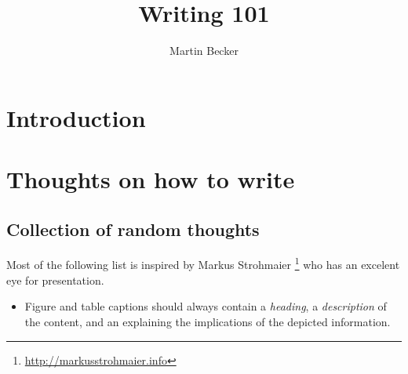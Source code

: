 \documentclass[a4paper]{memoir}
\title{Writing 101}
\author{Martin Becker}
\newcommand{\furl}[1]{\footnote{\url{#1}}}
\begin{document}
\chapter{Introduction}

\chapter{Thoughts on how to write}
\section{Collection of random thoughts}
Most of the following list is inspired by Markus
Strohmaier \furl{http://markusstrohmaier.info} who has an excelent eye
for presentation.
\begin{itemize}
	\item Figure and table captions should always contain a \textit{heading}, 
	a \textit{description} of the content, and an 
	explaining the implications of the depicted information.
\end{itemize} 

\listoftodos 

\end{document}

